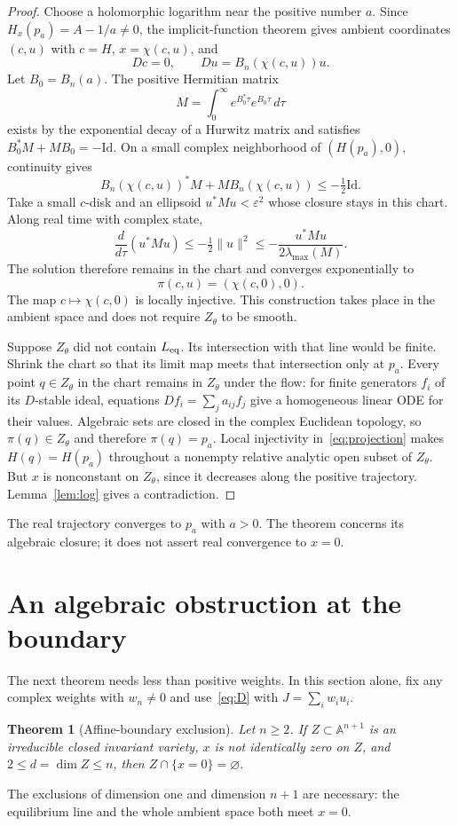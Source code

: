 \documentclass[11pt]{article}
\newtheorem{theorem}{Theorem}[section]
\theoremstyle{remark}\newtheorem{remark}[theorem]{Remark}
\newcommand{\A}{\mathbb A}
\begin{document}
\begin{proof}
Choose a holomorphic logarithm near the positive number $a$. Since $H_x(p_a)=A-1/a\ne0$, the implicit-function theorem gives ambient coordinates $(c,u)$ with $c=H$, $x=\chi(c,u)$, and
\[
 Dc=0,\qquad Du=B_n(\chi(c,u))u.
\]
Let $B_0=B_n(a)$. The positive Hermitian matrix
\[
 M=\int_0^\infty e^{B_0^*\tau}e^{B_0\tau}\,d\tau
\]
exists by the exponential decay of a Hurwitz matrix and satisfies $B_0^*M+MB_0=-\mathrm{Id}$. On a small complex neighborhood of $(H(p_a),0)$, continuity gives
\[
 B_n(\chi(c,u))^*M+M B_n(\chi(c,u))\leq-\tfrac12\mathrm{Id}.
\]
Take a small $c$-disk and an ellipsoid $u^*Mu<\varepsilon^2$ whose closure stays in this chart. Along real time with complex state,
\[
 \frac{d}{d\tau}(u^*Mu)\leq-\tfrac12\|u\|^2
 \leq-\frac{u^*Mu}{2\lambda_{\max}(M)}.
\]
The solution therefore remains in the chart and converges exponentially to
\begin{equation}\label{eq:projection}
 \pi(c,u)=(\chi(c,0),0).
\end{equation}
The map $c\mapsto\chi(c,0)$ is locally injective. This construction takes place in the ambient space and does not require $Z_\theta$ to be smooth.

Suppose $Z_\theta$ did not contain $L_{\rm eq}$. Its intersection with that line would be finite. Shrink the chart so that its limit map meets that intersection only at $p_a$. Every point $q\in Z_\theta$ in the chart remains in $Z_\theta$ under the flow: for finite generators $f_i$ of its $D$-stable ideal, equations $Df_i=\sum_j a_{ij}f_j$ give a homogeneous linear ODE for their values. Algebraic sets are closed in the complex Euclidean topology, so $\pi(q)\in Z_\theta$ and therefore $\pi(q)=p_a$. Local injectivity in~\eqref{eq:projection} makes $H(q)=H(p_a)$ throughout a nonempty relative analytic open subset of $Z_\theta$. But $x$ is nonconstant on $Z_\theta$, since it decreases along the positive trajectory. Lemma~\ref{lem:log} gives a contradiction.
\end{proof}
The real trajectory converges to $p_a$ with $a>0$. The theorem concerns its algebraic closure; it does not assert real convergence to $x=0$.

\section{An algebraic obstruction at the boundary}\label{sec:boundary}
The next theorem needs less than positive weights. In this section alone, fix any complex weights with $w_n\ne0$ and use~\eqref{eq:D} with $J=\sum_iw_i u_i$.
\begin{theorem}[Affine-boundary exclusion]\label{thm:B}
Let $n\geq2$. If $Z\subset\A^{n+1}$ is an irreducible closed invariant variety, $x$ is not identically zero on $Z$, and $2\leq d=\dim Z\leq n$, then $Z\cap\{x=0\}=\varnothing$.
\end{theorem}
The exclusions of dimension one and dimension $n+1$ are necessary: the equilibrium line and the whole ambient space both meet $x=0$.
\end{document}
